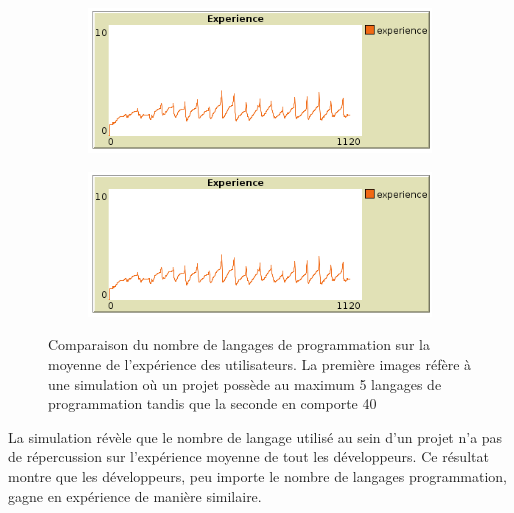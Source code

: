 \documentclass{article}
\begin{document}

\begin{figure}[H]
  \begin{subfigure}{.5\textwidth}
    \centering
    \includegraphics[width=1\linewidth]{pictures/langage40_experience.png}
  \end{subfigure}
  \begin{subfigure}{.5\textwidth}
    \centering
    \includegraphics[width=1\linewidth]{pictures/langage40_experience.png}
  \end{subfigure}
  \caption{Comparaison du nombre de langages de programmation sur la moyenne de l'expérience des utilisateurs. La première images réfère à une simulation où un projet possède au maximum 5 langages de programmation tandis que la seconde en comporte 40}
\end{figure}

La simulation révèle que le nombre de langage utilisé au sein d'un projet n'a pas de répercussion sur l'expérience moyenne de tout les développeurs.
Ce résultat montre que les développeurs, peu importe le nombre de langages programmation, gagne en expérience de manière similaire.

\end{document}
